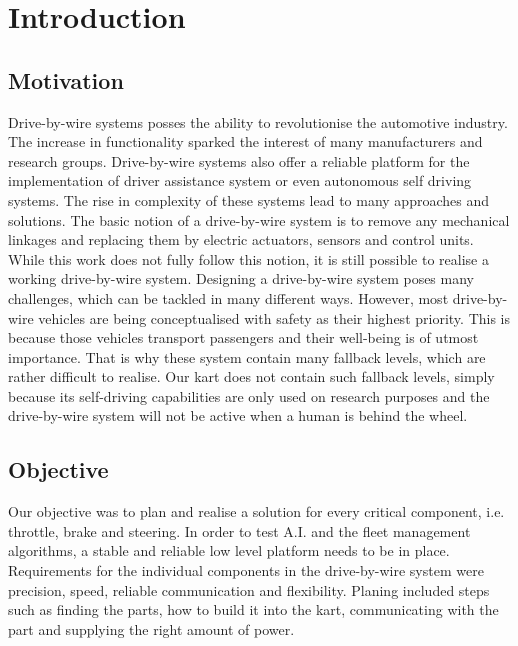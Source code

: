 
\chapter{Introduction}
\label{chp:Introduction}

\section{Motivation}

Drive-by-wire systems posses the ability to revolutionise the automotive industry. The increase in functionality sparked the interest of many manufacturers and research groups. Drive-by-wire systems also offer a reliable platform for the implementation of driver assistance system or even autonomous self driving systems. The rise in complexity of these systems lead to many approaches and solutions. The basic notion of a drive-by-wire system is to remove any mechanical linkages and replacing them by electric actuators, sensors and control units. While this work does not fully follow this notion, it is still possible to realise a working drive-by-wire system.
Designing a drive-by-wire system poses many challenges, which can be tackled in many different ways. However, most drive-by-wire vehicles are being conceptualised with safety as their highest priority. This is because those vehicles transport passengers and their well-being is of utmost importance. That is why these system contain many fallback levels, which are rather difficult to realise. Our kart does not contain such fallback levels, simply because its self-driving capabilities are only used on research purposes and the drive-by-wire system will not be active when a human is behind the wheel. 


\section{Objective}
Our objective was to plan and realise a solution for every critical component, i.e. throttle, brake and steering. In order to test A.I. and the fleet management algorithms, a stable and reliable low level platform needs to be in place. Requirements for the individual components in the drive-by-wire system were precision, speed, reliable communication and flexibility. Planing included steps such as finding the parts, how to build it into the kart, communicating with the part and supplying the right amount of power.

